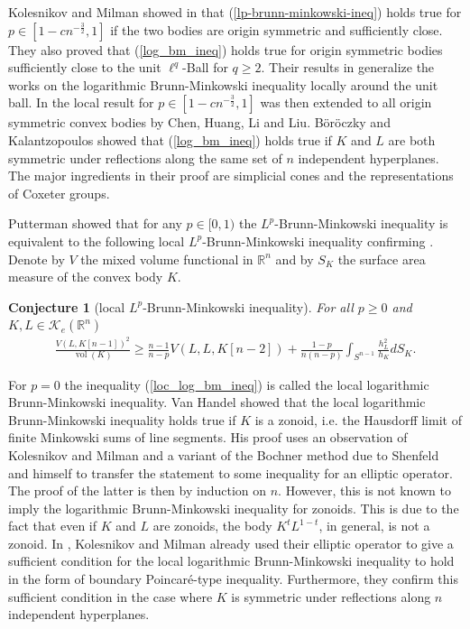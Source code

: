 \documentclass[12pt,twoside]{amsart}
\numberwithin{satz}{section}
\newtheorem{conjecture}[satz]{Conjecture}
\theoremstyle{definition}
\numberwithin{equation}{section}
\newcommand\R{\mathbb{R}}
\newcommand\vol{\operatorname{vol}}
\newcommand\Kc{\mathcal{K}}
\begin{document}
	Kolesnikov and Milman showed in \cite[Theorem 1.1]{kolesnikovmilman} that (\ref{lp-brunn-minkowski-ineq}) holds true for $p\in\left[1-cn^{-\frac{3}{2}},1\right]$ if the two bodies are origin symmetric and sufficiently close. They also proved that (\ref{log_bm_ineq}) holds true for origin symmetric bodies sufficiently close to the unit $\ell^q$-Ball for $q\geq 2$. Their results in \cite[Theorem 1.2, Theorem 1.3]{kolesnikovmilman} generalize the works \cite{colesantilivshyts, colesantilivshytsmarsiglietti} on the logarithmic Brunn-Minkowski inequality locally around the unit ball. In \cite{chenhuangliliu} the local result for $p\in\left[1-cn^{-\frac{3}{2}},1\right]$ was then extended to all origin symmetric convex bodies by Chen, Huang, Li and Liu. Böröczky and Kalantzopoulos \cite{boeroeczkykalantzopoulos} showed that (\ref{log_bm_ineq}) holds true if $K$ and $L$ are both symmetric under reflections along the same set of $n$ independent hyperplanes. The major ingredients in their proof are simplicial cones and the representations of Coxeter groups.
	
	Putterman \cite{putterman} showed that for any $p\in[0,1)$ the $L^p$-Brunn-Minkowski inequality is equivalent to the following local $L^p$-Brunn-Minkowski inequality confirming \cite[Conjecture 3.8]{kolesnikovmilman}. Denote by $V$ the mixed volume functional in $\R^n$ and by $S_K$ the surface area measure of the convex body $K$.
	
	\begin{conjecture}[local $L^p$-Brunn-Minkowski inequality]\label{loc_log_bm}
		For all $p\geq 0$ and $K,L\in\Kc_e(\R^n)$
		\begin{align}\label{loc_log_bm_ineq}
			\frac{V(L,K[n-1])^2}{\vol(K)}\geq \frac{n-1}{n-p}V(L,L,K[n-2])+\frac{1-p}{n(n-p)}\int_{S^{n-1}}\frac{h_L^2}{h_K}dS_K.
		\end{align}
	\end{conjecture}
	For $p=0$ the inequality (\ref{loc_log_bm_ineq}) is called the local logarithmic Brunn-Minkowski inequality. Van Handel \cite{vanhandel} showed that the local logarithmic Brunn-Minkowski inequality holds true if $K$ is a zonoid, i.e. the Hausdorff limit of finite Minkowski sums of line segments. His proof uses an observation of Kolesnikov and Milman \cite{kolesnikovmilman} and a variant of the Bochner method due to Shenfeld and himself \cite{shenfeldvanhandel} to transfer the statement to some inequality for an elliptic operator. The proof of the latter is then by induction on $n$. However, this is not known to imply the logarithmic Brunn-Minkowski inequality for zonoids. This is due to the fact that even if $K$ and $L$ are zonoids, the body $K^tL^{1-t}$, in general, is not a zonoid. In \cite{kolesnikovmilman}, Kolesnikov and Milman already used their elliptic operator to give a sufficient condition for the local logarithmic Brunn-Minkowski inequality to hold in the form of boundary Poincaré-type inequality. Furthermore, they confirm this sufficient condition in the case where $K$ is symmetric under reflections along $n$ independent hyperplanes. 
	
\end{document}
